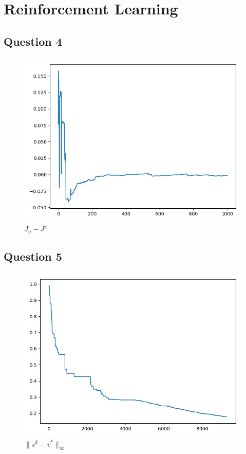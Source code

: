 \documentclass[10pt,a4paper]{article}
\begin{document}
\section{Reinforcement Learning}
\subsection{Question 4}
\begin{figure}[h]
\centering
\caption{$ J_n - J^{\pi} $}
\includegraphics[scale=.35]{q4.png}
\end{figure}

\subsection{Question 5}
\begin{figure}[h]
\centering
\caption{$\parallel v^k - v^* \parallel_{\infty}$}
\includegraphics[scale=.35]{q5.png}
\end{figure}
\end{document}
